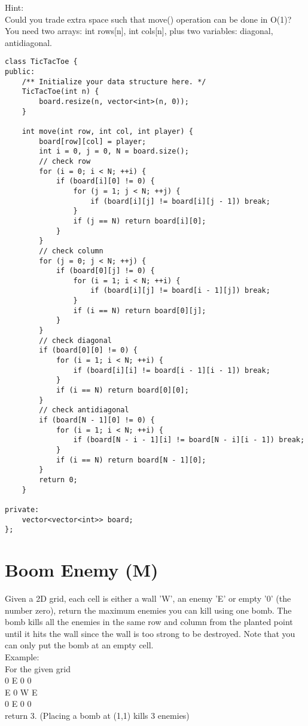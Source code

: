 Hint:\\
Could you trade extra space such that move() operation can be done in O(1)? You need two arrays: int rows[n], int cols[n], plus two variables: diagonal, antidiagonal. \\

\begin{lstlisting}
class TicTacToe {
public:
    /** Initialize your data structure here. */
    TicTacToe(int n) {
        board.resize(n, vector<int>(n, 0));   
    }

    int move(int row, int col, int player) {
        board[row][col] = player;
        int i = 0, j = 0, N = board.size();
        // check row
        for (i = 0; i < N; ++i) {
            if (board[i][0] != 0) {
                for (j = 1; j < N; ++j) {
                    if (board[i][j] != board[i][j - 1]) break;
                }
                if (j == N) return board[i][0];
            }
        }
        // check column
        for (j = 0; j < N; ++j) {
            if (board[0][j] != 0) {
                for (i = 1; i < N; ++i) {
                    if (board[i][j] != board[i - 1][j]) break;
                }
                if (i == N) return board[0][j];
            }
        }
        // check diagonal
        if (board[0][0] != 0) {
            for (i = 1; i < N; ++i) {
                if (board[i][i] != board[i - 1][i - 1]) break;
            }
            if (i == N) return board[0][0];
        }
        // check antidiagonal
        if (board[N - 1][0] != 0) {
            for (i = 1; i < N; ++i) {
                if (board[N - i - 1][i] != board[N - i][i - 1]) break;
            }
            if (i == N) return board[N - 1][0];
        }
        return 0;
    }
    
private:
    vector<vector<int>> board;
};
\end{lstlisting}


\section{Boom Enemy (M)}
Given a 2D grid, each cell is either a wall 'W', an enemy 'E' or empty '0' (the number zero), return the maximum enemies you can kill using one bomb.
The bomb kills all the enemies in the same row and column from the planted point until it hits the wall since the wall is too strong to be destroyed.
Note that you can only put the bomb at an empty cell.\\

Example:\\
For the given grid\\
0 E 0 0\\
E 0 W E\\
0 E 0 0\\
return 3. (Placing a bomb at (1,1) kills 3 enemies)\\

